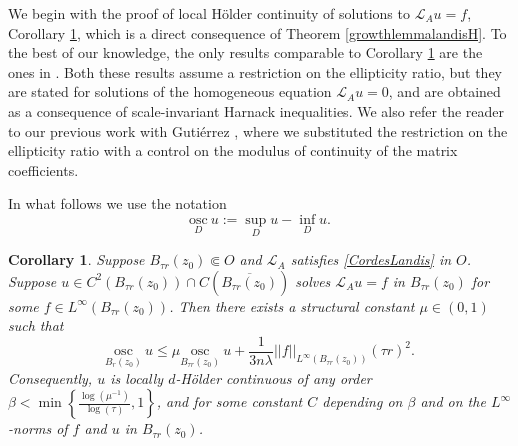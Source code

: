 \documentclass[12pt]{amsart}
\newtheorem{Corollary}[Theorem]{Corollary}
\newcommand{\osc}{\mathrm{osc}}
\def \L {\mathcal{L}}
\def \t {\tau}
\begin{document}
We begin with the proof of local H\"older continuity of solutions to $\L_A u = f$, Corollary \ref{oscillationdecay}, which is a direct consequence of Theorem \ref{growthlemmalandisH}. To the best of our knowledge, the only results comparable to Corollary \ref{oscillationdecay} are the ones in \cite{GT2011, T2014}. Both these results assume a restriction on the ellipticity ratio, but they are stated for solutions of the homogeneous equation $\L_A u = 0$, and are obtained as a consequence of scale-invariant Harnack inequalities. We also refer the reader to our previous work with Guti\'errez \cite{AGT2017}, where we substituted the restriction on the ellipticity ratio with a control on the modulus of continuity of the matrix coefficients. 

In what follows we use the notation
$$
\underset{D}{\osc} \ u := \sup_{D} u - \inf_{D} u.
$$

\begin{Corollary}\label{oscillationdecay} Suppose $B_{\t r}(z_0) \Subset O$ and $\L_A$ satisfies \eqref{CordesLandis} in $O$. Suppose $u \in C^2(B_{\t r}(z_0)) \cap C(\overline{B_{\t r}(z_0)})$ solves $\L_A u = f$ in $B_{\t r}(z_0)$ for some $f\in L^{\infty}(B_{\t r}(z_0))$. Then there exists a structural constant $\mu \in (0, 1)$ such that
$$\underset{B_r(z_0)}{\osc} \ u \leq \mu \underset{B_{\t r}(z_0)}{\osc} \ u + \frac{1}{3n\lambda}  ||f||_{L^{\infty}(B_{\t r}(z_0))} (\tau r)^2.$$
Consequently, $u$ is locally $d$-H\"older continuous of any order $\beta<\min\left\{\frac{\log(\mu^{-1})}{\log(\tau)},1\right\}$, and for some constant $C$ depending on $\beta$ and on the $L^\infty$-norms of $f$ and $u$ in $B_{\tau r}(z_0)$. 
\end{Corollary}
\end{document}
